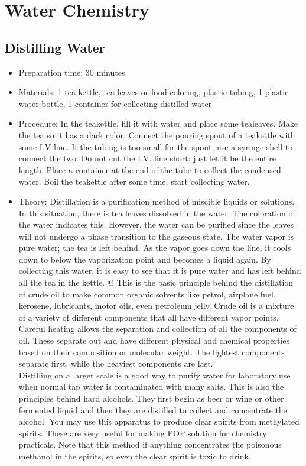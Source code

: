 \section{Water Chemistry}

\subsection{Distilling Water}
\begin{itemize}
\item{Preparation time: 30 minutes}
\item{Materials: 1 tea kettle, tea leaves or food coloring, plastic tubing, 1 plastic water bottle, 1 container for collecting distilled water}
\item{Procedure: In the teakettle, fill it with water and place some tealeaves. Make the tea so it has a dark color. Connect the pouring spout of a teakettle with some I.V line. If the tubing is too small for the spout, use a syringe shell to connect the two. Do not cut the I.V. line short; just let it be the entire length. Place a container at the end of the tube to collect the condensed water. Boil the teakettle after some time, start collecting water. }
\item{Theory: Distillation is a purification method of miscible liquids or solutions. In this situation, there is tea leaves dissolved in the water. The coloration of the water indicates this. However, the water can be purified since the leaves will not undergo a phase transition to the gaseous state. The water vapor is pure water; the tea is left behind. As the vapor goes down the line, it cools down to below the vaporization point and becomes a liquid again. By collecting this water, it is easy to see that it is pure water and has left behind all the tea in the kettle. @	This is the basic principle behind the distillation of crude oil to make common organic solvents like petrol, airplane fuel, kerosene, lubricants, motor oils, even petroleum jelly. Crude oil is a mixture of a variety of different components that all have different vapor points. Careful heating allows the separation and collection of all the components of oil. These separate out and have different physical and chemical properties based on their composition or molecular weight. The lightest components separate first, while the heaviest components are last.\\
Distilling on a larger scale is a good way to purify water for laboratory use when normal tap water is contaminated with many salts. This is also the principles behind hard alcohols. They first begin as beer or wine or other fermented liquid and then they are distilled to collect and concentrate the alcohol. You may use this apparatus to produce clear spirits from methylated spirits. These are very useful for making POP solution for chemistry practicals. Note that this method if anything concentrates the poisonous methanol in the spirits, so even the clear spirit is toxic to drink.}
\end{itemize}

